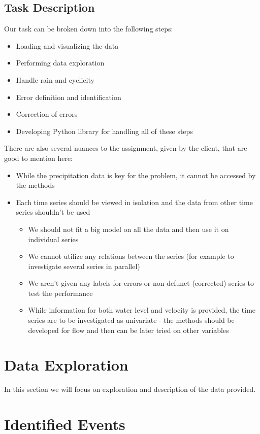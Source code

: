 \documentclass[12pt,a4paper]{article}
\begin{document}
\subsection{Task Description}
Our task can be broken down into the following steps:
\begin{itemize}
  \item Loading and visualizing the data
  \item Performing data exploration
  \item Handle rain and cyclicity
  \item Error definition and identification
  \item Correction of errors
  \item Developing Python library for handling all of these steps
\end{itemize}
There are also several nuances to the assignment, given by the client, that are good to mention here:
\begin{itemize}
    \item While the precipitation data is key for the problem, it cannot be accessed by the methods
    \item Each time series should be viewed in isolation and the data from other time series shouldn't be used
    \begin{itemize}
      \item{We should not fit a big model on all the data and then use it on individual series}
      \item{We cannot utilize any relations between the series (for example to investigate several series in parallel)}
      \item {We aren't given any labels for errors or non-defunct (corrected) series to test the performance}
      \item{While information for both water level and velocity is provided, the time series are to be investigated as univariate - the methods should be developed for flow and then can be later tried on other variables}
    \end{itemize}
\end{itemize}


\section{Data Exploration}
In this section we will focus on exploration and description of the data provided.




\section{Identified Events}
\end{document}
